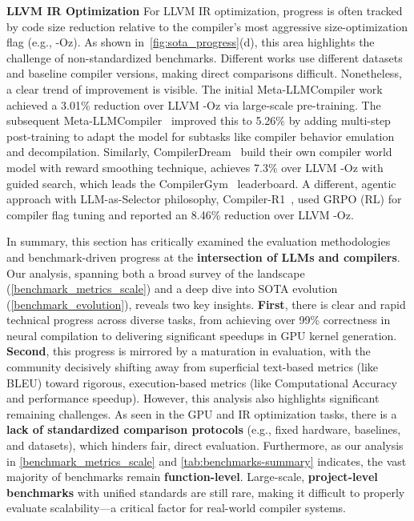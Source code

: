 \documentclass[pdflatex,sn-mathphys-ay,twocolumn, a4paper]{sn-jnl}%
\theoremstyle{thmstyleone}%
\theoremstyle{thmstyletwo}%
\theoremstyle{thmstylethree}%
\begin{document}
    \textbf{LLVM IR Optimization}
    For LLVM IR optimization, progress is often tracked by code size reduction relative to the compiler's most aggressive size-optimization flag (e.g., -Oz). As shown in~\autoref{fig:sota_progress}(d), this area highlights the challenge of non-standardized benchmarks. Different works use different datasets and baseline compiler versions, making direct comparisons difficult. Nonetheless, a clear trend of improvement is visible. 
    The initial Meta-LLMCompiler work~\citep{metallmcompiler-arxiv23} achieved a 3.01\% reduction over LLVM -Oz via large-scale pre-training.
    The subsequent Meta-LLMCompiler~\citep{metallmcompiler-cc25} improved this to 5.26\% by adding multi-step post-training to adapt the model for subtasks like compiler behavior emulation and decompilation. 
    Similarly, CompilerDream~\citep{11_deng2024compilerdream_arxiv} build their own compiler world model with reward smoothing technique, achieves 7.3\% over LLVM -Oz with guided search, which leads the CompilerGym~\citep{compilergym} leaderboard.
    A different, agentic approach with LLM-as-Selector philosophy, Compiler-R1~\citep{45_compilerr1-2025_arxiv}, used GRPO (RL) for compiler flag tuning and reported an 8.46\% reduction over LLVM -Oz.

In summary, this section has critically examined the evaluation methodologies and benchmark-driven progress at the \textbf{intersection of LLMs and compilers}. Our analysis, spanning both a broad survey of the landscape (\autoref{benchmark_metrics_scale}) and a deep dive into SOTA evolution (\autoref{benchmark_evolution}), reveals two key insights. 
\textbf{First}, there is clear and rapid technical progress across diverse tasks, from achieving over 99\% correctness in neural compilation to delivering significant speedups in GPU kernel generation. 
\textbf{Second}, this progress is mirrored by a maturation in evaluation, with the community decisively shifting away from superficial text-based metrics (like BLEU) toward rigorous, execution-based metrics (like Computational Accuracy and performance speedup). 
However, this analysis also highlights significant remaining challenges. As seen in the GPU and IR optimization tasks, there is a \textbf{lack of standardized comparison protocols} (e.g., fixed hardware, baselines, and datasets), which hinders fair, direct evaluation. Furthermore, as our analysis in \autoref{benchmark_metrics_scale} and \autoref{tab:benchmarks-summary} indicates, the vast majority of benchmarks remain \textbf{function-level}. Large-scale, \textbf{project-level benchmarks} with unified standards are still rare, making it difficult to properly evaluate scalability—a critical factor for real-world compiler systems.
\end{document}
